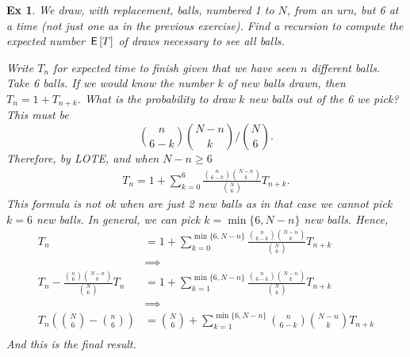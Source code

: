 \documentclass[a4paper,11pt]{article}
\newtheorem{exercise}[theorem]{Ex}
\begin{document}
\begin{exercise}
We draw, with replacement, balls, numbered 1 to $N$, from an urn, but 6 at a time (not just one as in the previous exercise).
Find a recursion to compute the expected number $\,\mathsf{E}\left[T\right]$ of draws necessary to see all balls.
\begin{solution}
  Write $T_{n}$ for expected time to finish given that we have seen $n$ different balls.
  Take 6 balls.
  If we would know the number $k$ of new balls drawn, then $T_{n} = 1 + T_{n+k}$.
  What is the probability to draw $k$ new balls  out of the 6 we pick?
  This must be
\begin{equation}
\label{eq:930}
{n \choose 6-k}{N-n \choose k}\big/{N \choose 6}.
\end{equation}
Therefore, by LOTE, and when $N-n\geq 6$
\begin{align}
T_{n} = 1 + \sum_{k=0}^{6} \frac{{n \choose 6-k}{N-n \choose k}}{{N \choose 6}} T_{n+k}.
\end{align}
This formula is not ok when are just 2 new balls as in that case we cannot pick $k=6$ new balls. In general, we can pick $k=\min\{6, N-n\}$ new balls. Hence,
\begin{align}
T_{n}
&=
1 + \sum_{k=0}^{\min\{6, N-n\}} \frac{{n \choose 6-k}{N-n \choose k}}{{N \choose 6}} T_{n+k} \\
&\implies \\
T_{n} - \frac{{n \choose 6}{N-n \choose 0}}{{N \choose 6}} T_{n}
&=1 + \sum_{k=1}^{\min\{6, N-n\}} \frac{{n \choose 6-k}{N-n \choose k}}{{N \choose 6}} T_{n+k} \\
&\implies \\
T_{n}\left( {N\choose 6}  -{n \choose 6} \right)
&={N\choose 6} + \sum_{k=1}^{\min\{6, N-n\}}{n \choose 6-k}{N-n \choose k} T_{n+k} \\
\end{align}
And this is the final result.

\end{solution}
\end{exercise}
\end{document}
